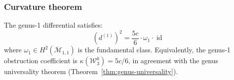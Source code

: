 \subsubsection{Curvature theorem}

\begin{theorem}
\label{thm:w3-genus1-curvature}
The genus-1 differential satisfies:
\begin{equation}\label{eq:w3-genus1-dsquared}
(d^{(1)})^2 = \frac{5c}{6} \cdot \omega_1 \cdot \operatorname{id}
\end{equation}
where $\omega_1 \in H^2(\overline{\mathcal{M}}_{1,1})$ is the fundamental
class.  Equivalently, the genus-1 obstruction coefficient is
$\kappa(\mathcal{W}_3^k) = 5c/6$, in agreement with the genus universality
theorem (Theorem~\ref{thm:genus-universality}).
\end{theorem}

